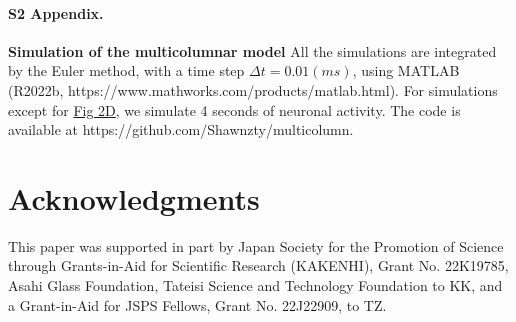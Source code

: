 \documentclass[10pt,letterpaper]{article}
\begin{document}
\paragraph*{S2 Appendix.}
\label{S2_Appendix}
{\bf Simulation of the multicolumnar model} All the simulations are integrated by the Euler method, with a time step $\Delta t=0.01 (ms)$, using MATLAB (R2022b, https://www.mathworks.com/products/matlab.html). For simulations except for \hyperlink{fig:fig2}{Fig 2D}, we simulate 4 seconds of neuronal activity. The code is available at https://github.com/Shawnzty/multicolumn.

\section*{Acknowledgments}
This paper was supported in part by Japan Society for the Promotion of Science through Grants-in-Aid for Scientific Research (KAKENHI), Grant No. 22K19785, Asahi Glass Foundation, Tateisi Science and Technology
Foundation to KK, and a Grant-in-Aid for JSPS Fellows, Grant No. 22J22909, to TZ.

\nolinenumbers
\end{document}
